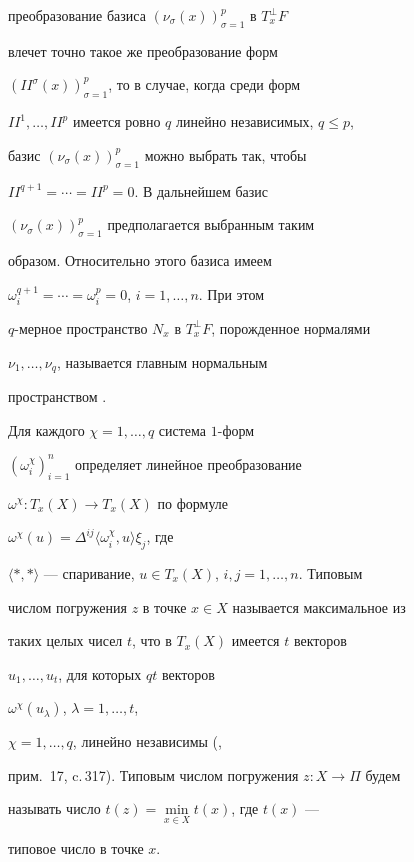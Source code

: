 преобразование базиса $(\nu_{\sigma}(x))_{\sigma=1}^p$ в $T^{\bot}_xF$


влечет точно такое же преобразование форм


$(II^{\sigma}(x))_{\sigma=1}^p$, то в случае, когда среди форм


$II^1,\dotsc,II^p$ имеется ровно $q$ линейно независимых, $q\le p$,


базис $(\nu_{\sigma}(x))_{\sigma=1}^p$ можно выбрать так, чтобы


$II^{q+1}=\dotsb=II^p=0$. В дальнейшем базис


$(\nu_{\sigma}(x))_{\sigma=1}^p$ предполагается выбранным таким


образом. Относительно этого базиса имеем


$\omega^{q+1}_i=\dotsb=\omega^p_i=0$, $i=1,\dotsc,n$. При этом


$q$-мерное пространство $N_x$ в $T^{\bot}_xF$, порожденное нормалями


$\nu_1,\dotsc,\nu_q$, называется главным нормальным


пространством \cite{Perep}.





Для каждого $\chi=1,\dotsc,q$ система $1$-форм


$(\omega^{\chi}_i)_{i=1}^n$ определяет линейное преобразование


$\omega^{\chi}:T_x(X)\to T_x(X)$ по формуле


$\omega^{\chi}(u)=\Delta^{ij}\langle\omega^{\chi}_i,u\rangle\xi_j$, где


$\langle *,*\rangle$ --- спаривание, $u\in T_x(X)$, $i,j=1,\dotsc,n$. Типовым


числом погружения $z$ в точке $x\in X$ называется максимальное из


таких целых чисел $t$, что в $T_x(X)$ имеется $t$ векторов


$u_1,\dotsc,u_t$, для которых $qt$ векторов


$\omega^{\chi}(u_{\lambda})$, $\lambda=1,\dotsc,t$,


$\chi=1,\dotsc,q$, линейно независимы (\cite{Koba},


прим.~17, c.\,317). Типовым числом погружения $z:X\to\Pi$ будем


называть число $t(z)=\min\limits_{x\in X}t(x)$, где $t(x)$ ---


типовое число в точке $x$.






